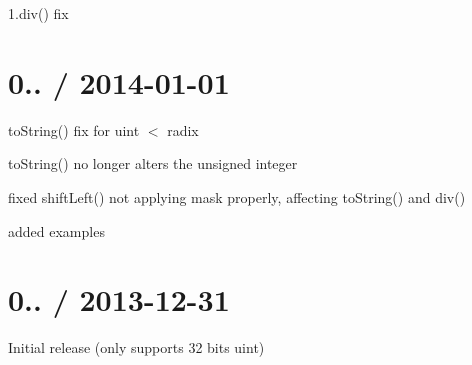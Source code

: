 \begin{DoxyItemize}
\item 1.\+div() fix
\end{DoxyItemize}

\section*{0.. / 2014-\/01-\/01 }


\begin{DoxyItemize}
\item to\+String() fix for uint $<$ radix
\item to\+String() no longer alters the unsigned integer
\item fixed shift\+Left() not applying mask properly, affecting to\+String() and div()
\item added examples
\end{DoxyItemize}

\section*{0.. / 2013-\/12-\/31 }


\begin{DoxyItemize}
\item Initial release (only supports 32 bits uint) 
\end{DoxyItemize}